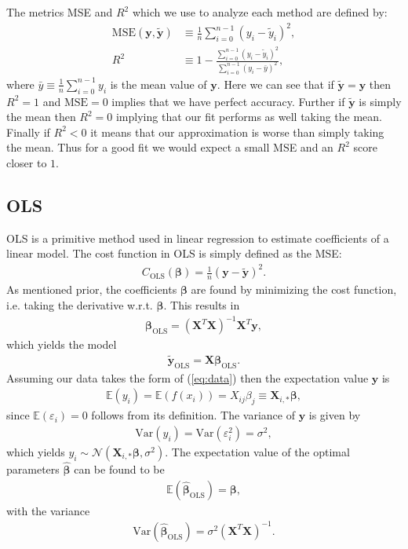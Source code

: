 \documentclass[%
reprint,
amsmath,amssymb,
aps,
pra,
]{revtex4-2}
\newcommand{\f}[2]{\frac{#1}{#2}}
\begin{document}
The metrics MSE and $R^2$ which we use to analyze each method are defined by:
\begin{align}
	\text{MSE}(\bm y,\tilde{\bm{y}})&\equiv\frac{1}{n}\sum_{i=0}^{n-1}(y_i-\tilde y_i)^2,\\
	R^2&\equiv1-\frac{\sum_{i=0}^{n-1}(y_i-\tilde y_i)^2}{\sum_{i=0}^{n-1}(y_i-\bar y)^2},
\end{align}
where $\bar y\equiv\frac{1}{n}\sum_{i=0}^{n-1}y_i$ is the mean value of $\bm y$. Here we can see that if $\tilde{\bm{y}}=\bm y$ then $R^2=1$ and $\text{MSE}=0$ implies that we have perfect accuracy. Further if $\tilde{\bm{y}}$ is simply the mean then $R^2=0$ implying that our fit performs as well taking the mean. Finally if $R^2<0$ it means that our approximation is worse than simply taking the mean. Thus for a good fit we would expect a small MSE and an $R^2$ score closer to $1$.

\subsection{OLS}
\label{sec:THEORY_OLS}
OLS is a primitive method used in linear regression to estimate coefficients of a linear model. The cost function in OLS is simply defined as the MSE:
\begin{align}
	C_\text{OLS}(\bm\beta)=\f1n(\bm y-\tilde{\bm y})^2.
	\label{eq:cost_ols}
\end{align}
As mentioned prior, the coefficients $\bm\beta$ are found by minimizing the cost function, i.e. taking the derivative w.r.t. $\bm\beta$. This results in
\begin{align}
	\bm\beta_\text{OLS}=(\bm X^T\bm X)^{-1}\bm X^T\bm y,
	\label{eq:beta_ols}
\end{align}
which yields the model
\begin{align}
	\tilde{\bm y}_\text{OLS}=\bm X\bm \beta_\text{OLS}.
\end{align}
Assuming our data takes the form of (\ref{eq:data}) then the expectation value $\bm y$ is
\begin{align*}
	\mathbb{E}(y_i)=\mathbb{E}(f(x_i))=X_{ij}\beta_j\equiv\bm X_{i,*}\bm\beta,
\end{align*}
since $\mathbb{E}(\varepsilon_i)=0$ follows from its definition. The variance of $\bm y$ is given by
\begin{align*}
	\text{Var}(y_i)=\text{Var}(\varepsilon_i^2)=\sigma^2,
\end{align*}
which yields $y_i\sim\mathcal{N}(\bm X_{i,*}\bm\beta,\sigma^2)$. The expectation value of the optimal parameters $\hat{\bm\beta}$ can be found to be
\begin{align*}
	\mathbb{E}(\hat{\bm\beta}_\text{OLS})=\bm\beta,
\end{align*}
with the variance
\begin{align*}
	\text{Var}(\hat{\bm\beta}_\text{OLS})=\sigma^2(\bm X^T \bm X)^{-1}.
\end{align*}
\end{document}
